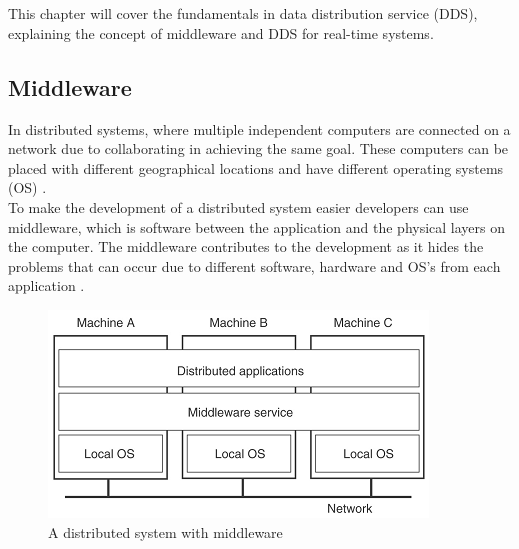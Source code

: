 \documentclass[Main]{subfiles}
\begin{document}
\chapter{}
This chapter will cover the fundamentals in data distribution service (DDS), explaining the concept of middleware and DDS for real-time systems.
\\
\section{Middleware}
In distributed systems, where multiple independent computers are connected on a network due to collaborating in achieving the same goal. These computers can be placed with different geographical locations and have different operating systems (OS) \cite[p. 2]{Tanenbaum}.
\\ To make the development of a distributed system easier developers can use middleware, which is software between the application and the physical layers on the computer. The middleware contributes to the development as it hides the problems that can occur due to different software, hardware and OS's from each application \cite[p. 3]{Tanenbaum}.

\begin{figure}[H]
\centering
\includegraphics[scale=1]{Figure/Middleware.png}
\caption{A distributed system with middleware \cite[p. 3]{Tanenbaum}}
\label{Fig:Middleware}
\end{figure}
\end{document}
